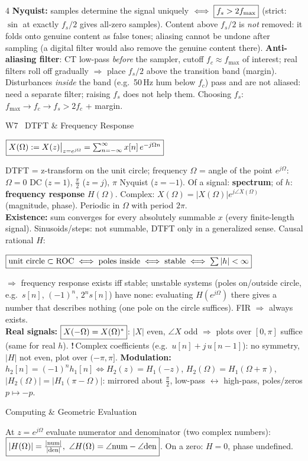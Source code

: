 \documentclass[a4paper,landscape]{article}
\newcommand{\sect}[1]{\par\vspace{1pt}\noindent\colorbox{secblue}{\parbox{\dimexpr\linewidth-2\fboxsep}{\color{white}\bfseries\fontsize{6.8}{7.6}\selectfont\strut #1}}\par\vspace{0.4pt}}
\newcommand{\sub}[1]{\par\vspace{0.6pt}\noindent\colorbox{subblue}{\parbox{\dimexpr\linewidth-2\fboxsep}{\bfseries\strut #1}}\par\vspace{0.2pt}}
\newcommand{\warn}[1]{{\color{warnred}\textbf{!}\,#1}}
\newcommand{\bx}[1]{\fbox{$\textstyle #1$}}
\newcommand{\eqc}[1]{\par\vspace{0.2pt}\centerline{$#1$}\par\vspace{0.2pt}}
\begin{document}
\begin{multicols*}{4}
\textbf{Nyquist:} samples determine the signal uniquely $\iff\bx{f_s>2f_{\max}}$ (strict: $\sin$ at exactly $f_s/2$ gives all-zero samples). Content above $f_s/2$ is \emph{not} removed: it folds onto genuine content as false tones; aliasing cannot be undone after sampling (a digital filter would also remove the genuine content there).
\textbf{Anti-aliasing filter}: CT low-pass \emph{before} the sampler, cutoff $f_c\approx f_{\max}$ of interest; real filters roll off gradually $\Rightarrow$ place $f_s/2$ above the transition band (margin). Disturbances \emph{inside} the band (e.g.\ 50\,Hz hum below $f_c$) pass and are not aliased: need a separate filter; raising $f_s$ does not help them. Choosing $f_s$: $f_{\max}\to f_c\to f_s>2f_c$ + margin.

\sect{W7 \ DTFT \& Frequency Response}
\eqc{\bx{X(\Omega):=X(z)\big|_{z=e^{j\Omega}}=\textstyle\sum_{n=-\infty}^{\infty}x[n]\,e^{-j\Omega n}}}
DTFT = z-transform on the unit circle; frequency $\Omega$ = angle of the point $e^{j\Omega}$: $\Omega{=}0$ DC ($z{=}1$), $\frac\pi2$ ($z{=}j$), $\pi$ Nyquist ($z{=}{-}1$). Of a signal: \textbf{spectrum}; of $h$: \textbf{frequency response} $H(\Omega)$. Complex: $X(\Omega)=|X(\Omega)|e^{j\angle X(\Omega)}$ (magnitude, phase). Periodic in $\Omega$ with period $2\pi$.\\
\textbf{Existence:} sum converges for every absolutely summable $x$ (every finite-length signal). Sinusoids/steps: not summable, DTFT only in a generalized sense. Causal rational $H$:
\eqc{\bx{\text{unit circle}\subset\text{ROC}\iff\text{poles inside}\iff\text{stable}\iff\textstyle\sum|h|<\infty}} $\Rightarrow$ frequency response exists iff stable; unstable systems (poles on/outside circle, e.g.\ $s[n]$, $(-1)^n$, $2^ns[n]$) have none: evaluating $H(e^{j\Omega})$ there gives a number that describes nothing (one pole on the circle suffices). FIR $\Rightarrow$ always exists.\\
\textbf{Real signals:} $\bx{X(-\Omega)=X(\Omega)^*}$: $|X|$ even, $\angle X$ odd $\Rightarrow$ plots over $[0,\pi]$ suffice (same for real $h$). \warn{Complex coefficients (e.g.\ $u[n]{+}j\,u[n{-}1]$): no symmetry, $|H|$ not even, plot over $(-\pi,\pi]$.}
\textbf{Modulation:} $h_2[n]=(-1)^nh_1[n]\iff H_2(z)=H_1(-z)$, $H_2(\Omega)=H_1(\Omega{+}\pi)$, $|H_2(\Omega)|=|H_1(\pi{-}\Omega)|$: mirrored about $\frac\pi2$, low-pass $\leftrightarrow$ high-pass, poles/zeros $p\mapsto-p$.
\sub{Computing \& Geometric Evaluation}
At $z=e^{j\Omega}$ evaluate numerator and denominator (two complex numbers): $\bx{|H(\Omega)|=\frac{|\mathrm{num}|}{|\mathrm{den}|},\ \angle H(\Omega)=\angle\mathrm{num}-\angle\mathrm{den}}$. On a zero: $H{=}0$, phase undefined.

\end{multicols*}
\end{document}
